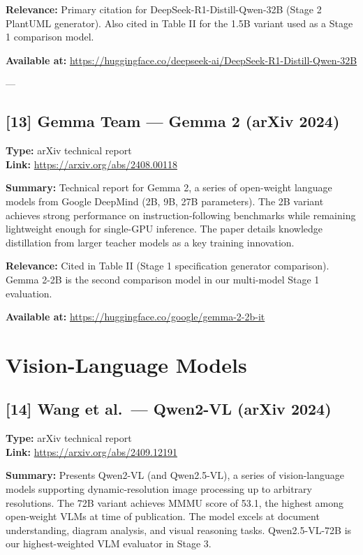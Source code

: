 \documentclass[11pt]{article}
\begin{document}
\textbf{Relevance:} Primary citation for DeepSeek-R1-Distill-Qwen-32B (Stage 2 PlantUML generator). Also cited in Table II for the 1.5B variant used as a Stage 1 comparison model.

\textbf{Available at:} \url{https://huggingface.co/deepseek-ai/DeepSeek-R1-Distill-Qwen-32B}

---

\subsection*{[13] Gemma Team — Gemma 2 (arXiv 2024)}
\textbf{Type:} arXiv technical report \\
\textbf{Link:} \url{https://arxiv.org/abs/2408.00118}

\textbf{Summary:} Technical report for Gemma 2, a series of open-weight language models from Google DeepMind (2B, 9B, 27B parameters). The 2B variant achieves strong performance on instruction-following benchmarks while remaining lightweight enough for single-GPU inference. The paper details knowledge distillation from larger teacher models as a key training innovation.

\textbf{Relevance:} Cited in Table II (Stage 1 specification generator comparison). Gemma 2-2B is the second comparison model in our multi-model Stage 1 evaluation.

\textbf{Available at:} \url{https://huggingface.co/google/gemma-2-2b-it}

\section{Vision-Language Models}

\subsection*{[14] Wang et al.\ — Qwen2-VL (arXiv 2024)}
\textbf{Type:} arXiv technical report \\
\textbf{Link:} \url{https://arxiv.org/abs/2409.12191}

\textbf{Summary:} Presents Qwen2-VL (and Qwen2.5-VL), a series of vision-language models supporting dynamic-resolution image processing up to arbitrary resolutions. The 72B variant achieves MMMU score of 53.1, the highest among open-weight VLMs at time of publication. The model excels at document understanding, diagram analysis, and visual reasoning tasks. Qwen2.5-VL-72B is our highest-weighted VLM evaluator in Stage 3.
\end{document}
